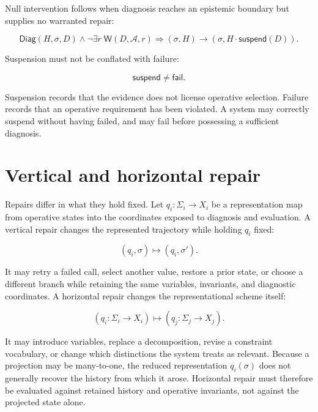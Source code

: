 \documentclass[11pt]{article}
\begin{document}
Null intervention follows when diagnosis reaches an epistemic boundary but supplies no warranted repair:

\begin{equation}
\mathsf{Diag}(H,\sigma,D)
\land
\neg\exists r\;\mathsf W(D,\mathcal A,r)
\Longrightarrow
(\sigma,H)\longrightarrow
(\sigma,H\cdot\mathsf{suspend}(D)).
\label{eq:null-proposition}
\end{equation}

Suspension must not be conflated with failure:

\begin{equation}
\mathsf{suspend}\neq\mathsf{fail}.
\end{equation}

Suspension records that the evidence does not license operative selection. Failure records that an operative requirement has been violated. A system may correctly suspend without having failed, and may fail before possessing a sufficient diagnosis.

\section{Vertical and horizontal repair}

Repairs differ in what they hold fixed. Let $q_i:\Sigma_i\to X_i$ be a representation map from operative states into the coordinates exposed to diagnosis and evaluation. A vertical repair changes the represented trajectory while holding $q_i$ fixed:

\begin{equation}
(q_i,\sigma)\longmapsto(q_i,\sigma').
\end{equation}

It may retry a failed call, select another value, restore a prior state, or choose a different branch while retaining the same variables, invariants, and diagnostic coordinates. A horizontal repair changes the representational scheme itself:

\begin{equation}
(q_i:\Sigma_i\to X_i)
\longmapsto
(q_j:\Sigma_j\to X_j).
\end{equation}

It may introduce variables, replace a decomposition, revise a constraint vocabulary, or change which distinctions the system treats as relevant. Because a projection may be many-to-one, the reduced representation $q_i(\sigma)$ does not generally recover the history from which it arose. Horizontal repair must therefore be evaluated against retained history and operative invariants, not against the projected state alone.
\end{document}
